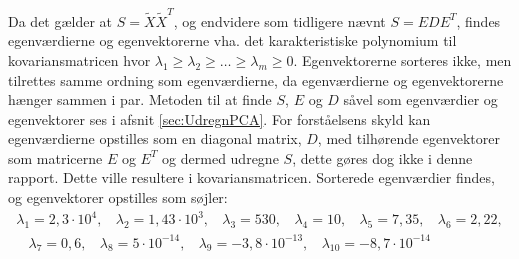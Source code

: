 Da det gælder at $S=\tilde{X}\tilde{X}^T$, og endvidere som tidligere nævnt $S = EDE^T$, findes egenværdierne og egenvektorerne vha. det karakteristiske polynomium til kovariansmatricen hvor $\lambda_1 \geq \lambda_2 \geq \ldots \geq \lambda_m \geq 0$. Egenvektorerne sorteres ikke, men tilrettes samme ordning som egenværdierne, da egenværdierne og egenvektorerne hænger sammen i par. Metoden til at finde $S$, $E$ og $D$ såvel som egenværdier og egenvektorer ses i afsnit \ref{sec:UdregnPCA}. For forståelsens skyld kan egenværdierne opstilles som en diagonal matrix, $D$, med tilhørende egenvektorer som matricerne $E$ og $E^T$ og dermed udregne $S$, dette gøres dog ikke i denne rapport. Dette ville resultere i kovariansmatricen.
Sorterede egenværdier findes, og egenvektorer opstilles som søjler: 
\begin{align*}
\lambda_1 = 2,3 \cdot 10^4,\phantom{m}\lambda_2 = 1,43 \cdot 10^3 ,\phantom{m}\lambda_3 = 530,\phantom{m}\lambda_4 = 10,\phantom{m}\lambda_5 = 7,35,\phantom{m}\lambda_6 = 2,22,\\
\phantom{m}\lambda_7 = 0,6,\phantom{m}\lambda_8 = 5 \cdot 10^{-14},\phantom{m}\lambda_9 = -3,8 \cdot 10^{-13},\phantom{m}\lambda_{10} = -8,7 \cdot 10^{-14}
\end{align*}

